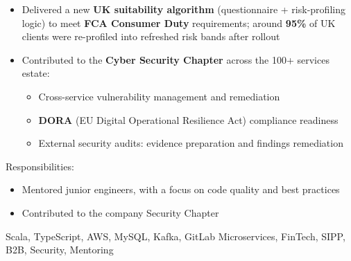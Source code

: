 \begin{cventries}
{\begin{cvitems}
\begin{itemize}
\begin{itemize}
							\end{itemize}
						\item Delivered a new \textbf{UK suitability algorithm} (questionnaire + risk-profiling logic) to meet \textbf{FCA Consumer Duty} requirements; around \textbf{95\%} of UK clients were re-profiled into refreshed risk bands after rollout
						\item Contributed to the \textbf{Cyber Security Chapter} across the 100+ services estate:
							\begin{itemize}
								\item Cross-service vulnerability management and remediation
								\item \textbf{DORA} (EU Digital Operational Resilience Act) compliance readiness
								\item External security audits: evidence preparation and findings remediation
							\end{itemize}
					\end{itemize}
				\item Responsibilities:
					\begin{itemize}
						\item Mentored junior engineers, with a focus on code quality and best practices
						\item Contributed to the company Security Chapter
					\end{itemize}
			\end{cvitems}
    	}
        {Scala, TypeScript, AWS, MySQL, Kafka, GitLab}
		{Microservices, FinTech, SIPP, B2B, Security, Mentoring}


\end{cventries}
